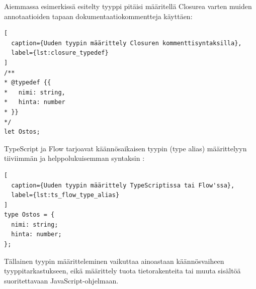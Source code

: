 Aiemmassa esimerkissä esitelty tyyppi  pitäisi
määritellä Closurea varten muiden annotaatioiden tapaan dokumentaatiokommentteja käyttäen:

\begin{lstlisting}[
  caption={Uuden tyypin määrittely Closuren kommenttisyntaksilla},
  label={lst:closure_typedef}
]
/**
* @typedef {{
*   nimi: string,
*   hinta: number
* }}
*/
let Ostos;
\end{lstlisting}
TypeScript ja Flow tarjoavat käännösaikaisen tyypin (type alias)
määrittelyyn tiiviimmän ja helppolukuisemman syntaksin \cite{TypeScriptSpec}:
\begin{lstlisting}[
  caption={Uuden tyypin määrittely TypeScriptissa tai Flow'ssa},
  label={lst:ts_flow_type_alias}
]
type Ostos = {
  nimi: string;
  hinta: number;
};
\end{lstlisting}
Tällainen tyypin määritteleminen vaikuttaa ainoastaan käännösvaiheen
tyyppitarkastukseen, eikä määrittely tuota tietorakenteita tai muuta
sisältöä suoritettavaan JavaScript-ohjelmaan.

